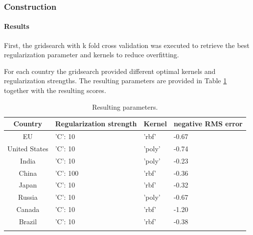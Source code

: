 \subsubsection{Construction}
\paragraph{Results}

First, the gridsearch with k fold cross validation was executed to retrieve the best regularization parameter and kernels to reduce overfitting.

For each country the gridsearch provided different optimal kernels and regularization strengths. The resulting parameters are provided in Table \ref{buildings:kernel} together with the resulting scores.

\begin{table}[h!]
	\centering
	\begin{tabular}{clll}
		\hline
		Country & Regularization strength & Kernel & negative RMS error \\
		\hline
		\hline 
		EU & 'C': 10 & 'rbf' &
		-0.67 \\
		United States & 'C': 10 & 'poly' & 
		-0.74 \\
		India &'C': 10 & 'poly' &
		-0.23 \\
		China &'C': 100 &  'rbf' &
		-0.36 \\
		Japan &  'C': 10 & 'rbf' &
		-0.32 \\
		Russia &'C': 10 & 'poly' &
		-0.67 \\
		Canada &'C': 10 & 'rbf' &
		-1.20 \\
		Brazil &'C': 10 & 'rbf' &
		-0.38 \\
		\hline 
		&&& \\
	\end{tabular}
	\caption{Resulting parameters.}
	\label{buildings:kernel}  
\end{table}



